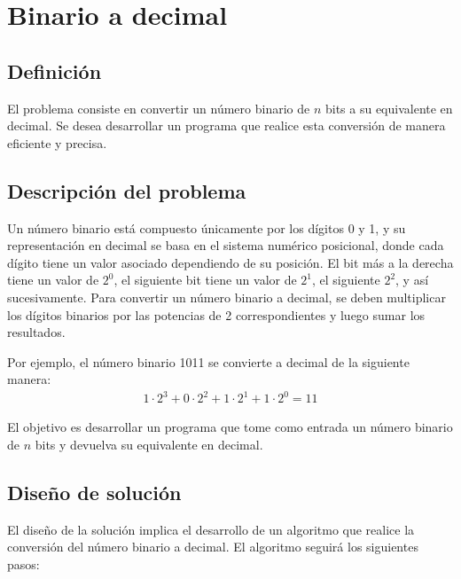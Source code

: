 
\section{Binario a decimal}

\subsection{Definición}

El problema consiste en convertir un número binario de $n$ bits a su equivalente en decimal. Se desea desarrollar un programa que realice esta conversión de manera eficiente y precisa.

\subsection{Descripción del problema}

Un número binario está compuesto únicamente por los dígitos 0 y 1, y su representación en decimal se basa en el sistema numérico posicional, donde cada dígito tiene un valor asociado dependiendo de su posición. El bit más a la derecha tiene un valor de $2^0$, el siguiente bit tiene un valor de $2^1$, el siguiente $2^2$, y así sucesivamente. Para convertir un número binario a decimal, se deben multiplicar los dígitos binarios por las potencias de 2 correspondientes y luego sumar los resultados.

Por ejemplo, el número binario 1011 se convierte a decimal de la siguiente manera:
\begin{align*}
1 \cdot 2^3 + 0 \cdot 2^2 + 1 \cdot 2^1 + 1 \cdot 2^0 = 11
\end{align*}

El objetivo es desarrollar un programa que tome como entrada un número binario de $n$ bits y devuelva su equivalente en decimal.

\subsection{Diseño de solución}

El diseño de la solución implica el desarrollo de un algoritmo que realice la conversión del número binario a decimal. El algoritmo seguirá los siguientes pasos:

